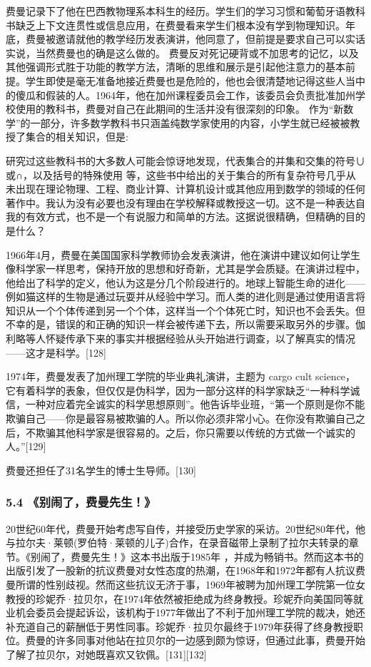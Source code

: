 费曼记录下了他在巴西教物理系本科生的经历。学生们的学习习惯和葡萄牙语教科书缺乏上下文连贯性或信息应用，在费曼看来学生们根本没有学到物理知识。年底，费曼被邀请就他的教学经历发表演讲，他同意了，但前提是要求自己可以实话实说，当然费曼也的确是这么做的。 费曼反对死记硬背或不加思考的记忆，以及其他强调形式胜于功能的教学方法，清晰的思维和展示是引起他注意力的基本前提。学生即使是毫无准备地接近费曼也是危险的，他也会很清楚地记得这些人当中的傻瓜和假装的人。1964年，他在加州课程委员会工作，该委员会负责批准加州学校使用的教科书，费曼对自己在此期间的生活并没有很深刻的印象。 作为“新数学”的一部分，许多数学教科书只涵盖纯数学家使用的内容，小学生就已经被被教授了集合的相关知识，但是:

研究过这些教科书的大多数人可能会惊讶地发现，代表集合的并集和交集的符号∪或∩，以及括号的特殊使用{ }等，这些书中给出的关于集合的所有复杂符号几乎从未出现在理论物理、工程、商业计算、计算机设计或其他应用到数学的领域的任何著作中。我认为没有必要也没有理由在学校解释或教授这一切。这不是一种表达自我的有效方式，也不是一个有说服力和简单的方法。这据说很精确，但精确的目的是什么？

1966年4月，费曼在美国国家科学教师协会发表演讲，他在演讲中建议如何让学生像科学家一样思考，保持开放的思想和好奇新，尤其是学会质疑。在演讲过程中，他给出了科学的定义，他认为这是分几个阶段进行的。地球上智能生命的进化——例如猫这样的生物是通过玩耍并从经验中学习。而人类的进化则是通过使用语言将知识从一个个体传递到另一个个体，这样当一个个体死亡时，知识也不会丢失。但不幸的是，错误的和正确的知识一样会被传递下去，所以需要采取另外的步骤。伽利略等人怀疑传承下来的事实并根据经验从头开始进行调查，以了解真实的情况——这才是科学。[128]

1974年，费曼发表了加州理工学院的毕业典礼演讲，主题为 cargo cult science，它有着科学的表象，但仅仅是伪科学，因为一部分这样的科学家缺乏“一种科学诚信，一种对应着完全诚实的科学思想原则”。他告诉毕业班，“第一个原则是你不能欺骗自己——你是最容易被欺骗的人。所以你必须非常小心。在你没有欺骗自己之后，不欺骗其他科学家是很容易的。之后，你只需要以传统的方式做一个诚实的人。”[129]

费曼还担任了31名学生的博士生导师。[130]

\subsubsection{5.4 《别闹了，费曼先生！》}
20世纪60年代，费曼开始考虑写自传，并接受历史学家的采访。20世纪80年代，他与拉尔夫·莱顿(罗伯特·莱顿的儿子)合作，在录音磁带上录制了拉尔夫转录的章节。《别闹了，费曼先生！》这本书出版于1985年 ，并成为畅销书。然而这本书的出版引发了一股新的抗议费曼对女性态度的热潮，在1968年和1972年都有人抗议费曼所谓的性别歧视。然而这些抗议无济于事，1969年被聘为加州理工学院第一位女教授的珍妮乔·拉贝尔，在1974年依然被拒绝成为终身教授。珍妮乔向美国同等就业机会委员会提起诉讼，该机构于1977年做出了不利于加州理工学院的裁决，她还补充道自己的薪酬低于男性同事。珍妮乔·拉贝尔最终于1979年获得了终身教授职位。费曼的许多同事对他站在拉贝尔的一边感到颇为惊讶，但通过此事，费曼开始了解了拉贝尔，对她既喜欢又钦佩。[131][132]

